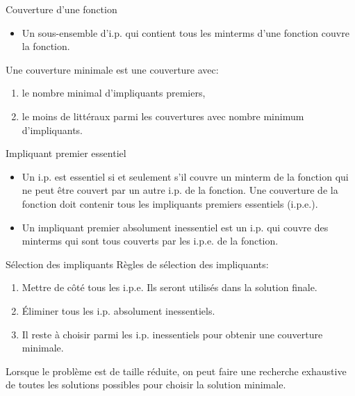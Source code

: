 \documentclass[presentation]{beamer}
\begin{document}
\begin{frame}[label={sec:org9debb73}]{Couverture d'une fonction}
\begin{itemize}
\item Un sous-ensemble d'i.p. qui contient tous les minterms d'une fonction \alert{couvre} la fonction.
\end{itemize}

Une \alert{couverture minimale} est une couverture avec:

\begin{enumerate}
\item le nombre minimal d'impliquants premiers,

\item le moins de littéraux parmi les couvertures avec nombre minimum
d'impliquants.
\end{enumerate}
\end{frame}

\begin{frame}[label={sec:org80e2035}]{Impliquant premier essentiel}
\begin{itemize}
\item Un i.p. est \alert{essentiel} si et seulement s'il couvre un minterm de la fonction qui ne peut être couvert par un autre i.p. de la fonction.  Une couverture de la fonction \alert{doit} contenir tous les impliquants premiers essentiels (i.p.e.).

\item Un \alert{impliquant premier absolument inessentiel} est un i.p. qui couvre des minterms qui sont tous couverts par les i.p.e. de la fonction.
\end{itemize}
\end{frame}

\begin{frame}[label={sec:org2723fce}]{Sélection des impliquants}
Règles de sélection des impliquants:

\begin{enumerate}
\item Mettre de côté tous les i.p.e. Ils seront utilisés dans la solution
finale.

\item Éliminer tous les i.p. absolument inessentiels.

\item Il reste à choisir parmi les i.p. inessentiels pour obtenir une
couverture minimale.
\end{enumerate}

Lorsque le problème est de taille réduite, on peut faire une recherche exhaustive de toutes les solutions possibles pour choisir la solution minimale.
\end{frame}
\end{document}
